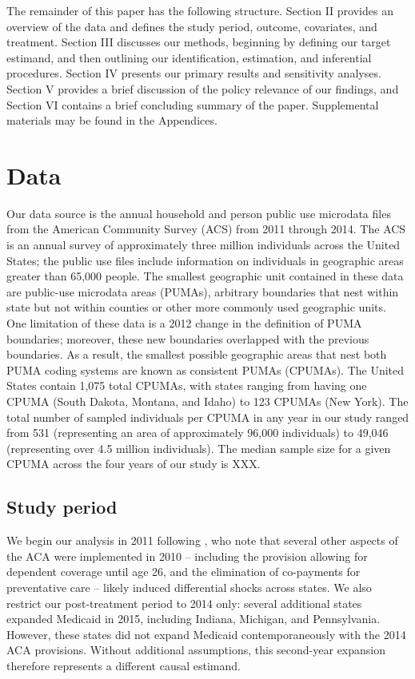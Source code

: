 \documentclass[12pt]{article}
\begin{document}
The remainder of this paper has the following structure. Section II provides an overview of the data and defines the study period, outcome, covariates, and treatment. Section III discusses our methods, beginning by defining our target estimand, and then outlining our identification, estimation, and inferential procedures. Section IV presents our primary results and sensitivity analyses. Section V provides a brief discussion of the policy relevance of our findings, and Section VI contains a brief concluding summary of the paper. Supplemental materials may be found in the Appendices.

\section{Data}

Our data source is the annual household and person public use microdata files from the American Community Survey (ACS) from 2011 through 2014. The ACS is an annual survey of approximately three million individuals across the United States; the public use files include information on individuals in geographic areas greater than 65,000 people. The smallest geographic unit contained in these data are public-use microdata areas (PUMAs), arbitrary boundaries that nest within state but not within counties or other more commonly used geographic units. One limitation of these data is a 2012 change in the definition of PUMA boundaries; moreover, these new boundaries overlapped with the previous boundaries. As a result, the smallest possible geographic areas that nest both PUMA coding systems are known as consistent PUMAs (CPUMAs). The United States contain 1,075 total CPUMAs, with states ranging from having one CPUMA (South Dakota, Montana, and Idaho) to 123 CPUMAs (New York). The total number of sampled individuals per CPUMA in any year in our study ranged from 531 (representing an area of approximately 96,000 individuals) to 49,046 (representing over 4.5 million individuals). The median sample size for a given CPUMA across the four years of our study is XXX.

\subsection{Study period}

We begin our analysis in 2011 following \cite{courtemanche2017early}, who note that several other aspects of the ACA were implemented in 2010 -- including the provision allowing for dependent coverage until age 26, and the elimination of co-payments for preventative care -- likely induced differential shocks across states. We also restrict our post-treatment period to 2014 only: several additional states expanded Medicaid in 2015, including Indiana, Michigan, and Pennsylvania. However, these states did not expand Medicaid contemporaneously with the 2014 ACA provisions. Without additional assumptions, this second-year expansion therefore represents a different causal estimand. 
\end{document}

